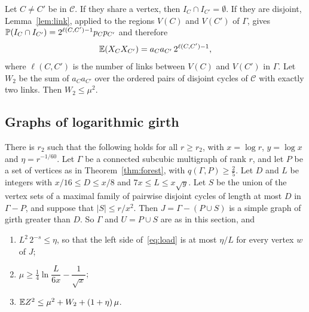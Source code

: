 \documentclass[11pt]{article}
\begin{document}
Let $C\ne C'$ be in $\mathcal{C}$. If they share a vertex, then $I_C\cap I_{C'}=\emptyset$. If they
are disjoint, Lemma~\ref{lem:link}, applied to the regions $V(C)$ and $V(C')$ of $\Gamma$, gives
$\mathbb{P}(I_C\cap I_{C'})=2^{\ell(C,C')-1}p_Cp_{C'}$ and therefore
\begin{equation}\label{eq:pair}
  \mathbb{E}(X_CX_{C'})=a_Ca_{C'}\,2^{\ell(C,C')-1},
\end{equation}
where $\ell(C,C')$ is the number of links between $V(C)$ and $V(C')$ in $\Gamma$. Let $W_2$ be
the sum of $a_Ca_{C'}$ over the ordered pairs of disjoint cycles of $\mathcal{C}$ with exactly two
links. Then $W_2\le\mu^{2}$.

\subsection{Graphs of logarithmic girth}

\begin{proposition}\label{prop:loggirth}
There is $r_2$ such that the following holds for all $r\ge r_2$, with $x=\log r$, $y=\log x$ and
$\eta=r^{-1/60}$. Let $\Gamma$ be a connected subcubic multigraph of rank $r$, and let $P$ be a
set of vertices as in Theorem~\ref{thm:forest}, with $q(\Gamma,P)\ge\frac25$. Let $D$ and $L$ be
integers with $x/16\le D\le x/8$ and $7x\le L\le x\sqrt y$. Let $S$ be the union of the vertex
sets of a maximal family of pairwise disjoint cycles of length at most $D$ in $\Gamma-P$, and
suppose that $|S|\le r/x^{2}$. Then $J=\Gamma-(P\cup S)$ is a simple graph of girth greater than
$D$. So $\Gamma$ and $U=P\cup S$ are as in this section, and
\begin{enumerate}
\item[\textup{(i)}] $L^{2}\,2^{-s}\le\eta$, so that the left side of~\eqref{eq:load} is at most
$\eta/L$ for every vertex $w$ of $J$;
\item[\textup{(ii)}] $\mu\ge\frac14\ln\dfrac{L}{6x}-\dfrac1{\sqrt x}$;
\item[\textup{(iii)}] $\mathbb{E} Z^{2}\le\mu^{2}+W_2+(1+\eta)\,\mu$.
\end{enumerate}
\end{proposition}
\end{document}
